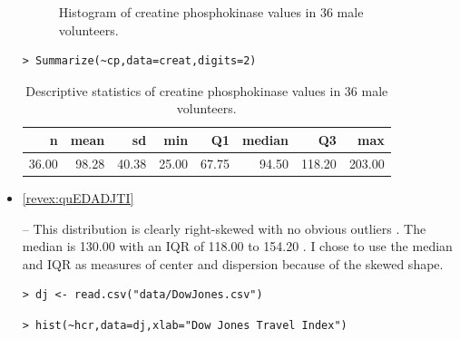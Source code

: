 \documentclass[10pt,openany]{book}\usepackage[]{graphicx}\usepackage[]{color}
\makeatletter
\newenvironment{kframe}{%
 \def\at@end@of@kframe{}%
 \ifinner\ifhmode%
  \def\at@end@of@kframe{\end{minipage}}%
  \begin{minipage}{\columnwidth}%
 \fi\fi%
 \def\FrameCommand##1{\hskip\@totalleftmargin \hskip-\fboxsep
 \colorbox{shadecolor}{##1}\hskip-\fboxsep
     \hskip-\linewidth \hskip-\@totalleftmargin \hskip\columnwidth}%
 \MakeFramed {\advance\hsize-\width
   \@totalleftmargin\z@ \linewidth\hsize
   \@setminipage}}%
 {\par\unskip\endMakeFramed%
 \at@end@of@kframe}
\newenvironment{knitrout}{}{} %
\makeatother
\begin{document}
\begin{itemize}
\begin{knitrout}
\begin{figure}[hbtp]
{}

\caption[Histogram of creatine phosphokinase values in 36 male volunteers]{Histogram of creatine phosphokinase values in 36 male volunteers.}\label{fig:CPHist}
\end{figure}


\end{knitrout}
\begin{knitrout}
\color{fgcolor}\begin{kframe}
\begin{verbatim}
> Summarize(~cp,data=creat,digits=2)
\end{verbatim}
\end{kframe}
\end{knitrout}
\begin{table}[ht]
\centering
\caption{Descriptive statistics of creatine phosphokinase values in 36 male volunteers.} 
\label{tab:CPSum}
\begin{tabular}{rrrrrrrr}
  \hline
n & mean & sd & min & Q1 & median & Q3 & max \\ 
  \hline
36.00 & 98.28 & 40.38 & 25.00 & 67.75 & 94.50 & 118.20 & 203.00 \\ 
   \hline
\end{tabular}
\end{table}




  \item \hypertarget{ans:quEDADJTI}{\ref{revex:quEDADJTI}} -- This distribution is clearly right-skewed with no obvious outliers .  The median is 130.00 with an IQR of 118.00 to 154.20 .  I chose to use the median and IQR as measures of center and dispersion because of the skewed shape.
\begin{knitrout}
\color{fgcolor}\begin{kframe}
\begin{verbatim}
> dj <- read.csv("data/DowJones.csv")
\end{verbatim}
\end{kframe}
\end{knitrout}
\begin{knitrout}
\color{fgcolor}\begin{kframe}
\begin{verbatim}
> hist(~hcr,data=dj,xlab="Dow Jones Travel Index")
\end{verbatim}
\end{kframe}\begin{figure}[hbtp]


\end{figure}
\end{knitrout}
\end{itemize}
\end{document}
